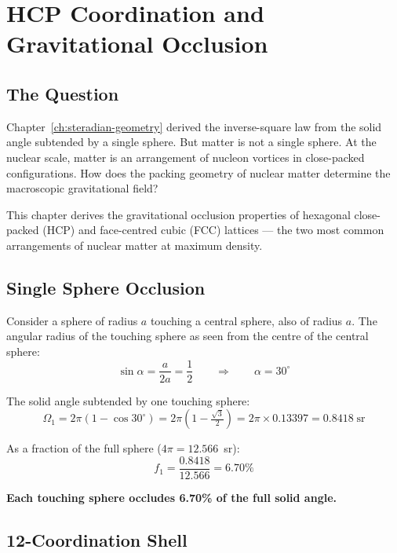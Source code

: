 \chapter{HCP Coordination and Gravitational Occlusion}
\label{ch:hcp-occlusion}


\section{The Question}

Chapter~\ref{ch:steradian-geometry} derived the inverse-square law from the solid angle subtended by a single sphere. But matter is not a single sphere. At the nuclear scale, matter is an arrangement of nucleon vortices in close-packed configurations. How does the packing geometry of nuclear matter determine the macroscopic gravitational field?

This chapter derives the gravitational occlusion properties of hexagonal close-packed (HCP) and face-centred cubic (FCC) lattices --- the two most common arrangements of nuclear matter at maximum density.


\section{Single Sphere Occlusion}

Consider a sphere of radius $a$ touching a central sphere, also of radius $a$. The angular radius of the touching sphere as seen from the centre of the central sphere:
\begin{equation}
  \sin\alpha = \frac{a}{2a} = \frac{1}{2} \qquad\Rightarrow\qquad \alpha = 30^\circ
\end{equation}

The solid angle subtended by one touching sphere:
\begin{equation}
  \Omega_1 = 2\pi(1 - \cos 30^\circ) = 2\pi(1 - \tfrac{\sqrt{3}}{2}) = 2\pi \times 0.13397 = 0.8418\;\text{sr}
\end{equation}

As a fraction of the full sphere ($4\pi = 12.566$~sr):
\begin{equation}
  f_1 = \frac{0.8418}{12.566} = 6.70\%
\end{equation}

\textbf{Each touching sphere occludes 6.70\% of the full solid angle.}


\section{12-Coordination Shell}

